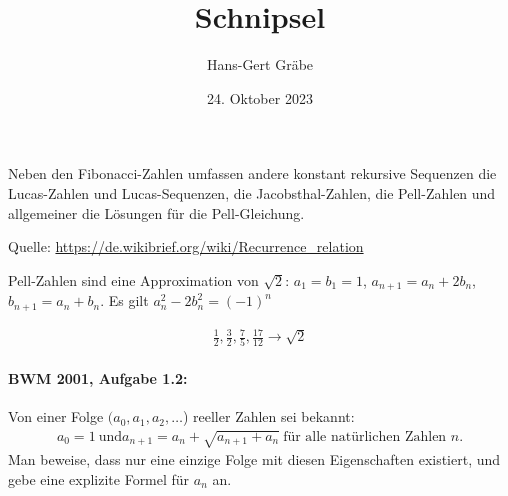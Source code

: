 \documentclass[11pt,a4paper]{article}
\title{Schnipsel}
\author{Hans-Gert Gräbe}
\date{24. Oktober 2023}
\begin{document}
\maketitle

Neben den Fibonacci-Zahlen umfassen andere konstant rekursive Sequenzen die
Lucas-Zahlen und Lucas-Sequenzen, die Jacobsthal-Zahlen, die Pell-Zahlen und
allgemeiner die Lösungen für die Pell-Gleichung.

Quelle: \url{https://de.wikibrief.org/wiki/Recurrence_relation}

Pell-Zahlen sind eine Approximation von $\sqrt{2}$: $a_1=b_1=1$,
$a_{n+1}=a_n+2b_n$, $b_{n+1}=a_n+b_n$. Es gilt $a_n^2-2b_n^2=(-1)^n$

\begin{gather*}
  \frac12, \frac32, \frac75, \frac{17}{12} \to \sqrt{2}
\end{gather*}

\paragraph{BWM 2001, Aufgabe 1.2:}
Von einer Folge $(a_0, a_1, a_2, \dots$) reeller Zahlen sei bekannt:
\begin{gather*}
  a_0 =1\ \text{und} a_{n+1}=a_n+\sqrt{a_{n+1}+a_n}\ \text{für alle
    natürlichen Zahlen $n$}. 
\end{gather*}
Man beweise, dass nur eine einzige Folge mit diesen Eigenschaften existiert,
und gebe eine explizite Formel für $a_n$ an.
\end{document}
